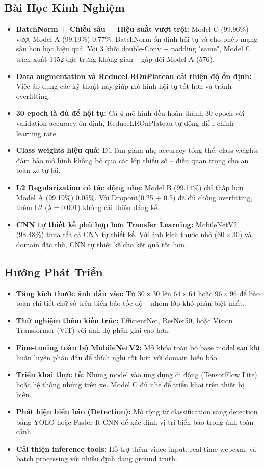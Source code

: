 \documentclass[12pt,a4paper]{article}
\begin{document}
\subsection{Bài Học Kinh Nghiệm}
\begin{itemize}
    \item \textbf{BatchNorm + Chiều sâu = Hiệu suất vượt trội:} Model C (99.96\%) vượt Model A (99.19\%) 0.77\%. BatchNorm ổn định hội tụ và cho phép mạng sâu hơn học hiệu quả. Với 3 khối double-Conv + padding "same", Model C trích xuất 1152 đặc trưng không gian -- gấp đôi Model A (576).
    \item \textbf{Data augmentation và ReduceLROnPlateau cải thiện độ ổn định:} Việc áp dụng các kỹ thuật này giúp mô hình hội tụ tốt hơn và tránh overfitting.
    \item \textbf{30 epoch là đủ để hội tụ:} Cả 4 mô hình đều hoàn thành 30 epoch với validation accuracy ổn định, ReduceLROnPlateau tự động điều chỉnh learning rate.
    \item \textbf{Class weights hiệu quả:} Dù làm giảm nhẹ accuracy tổng thể, class weights đảm bảo mô hình không bỏ qua các lớp thiểu số -- điều quan trọng cho an toàn xe tự lái.
    \item \textbf{L2 Regularization có tác động nhẹ:} Model B (99.14\%) chỉ thấp hơn Model A (99.19\%) 0.05\%. Với Dropout(0.25 + 0.5) đã đủ chống overfitting, thêm L2 ($\lambda=0.001$) không cải thiện đáng kể.
    \item \textbf{CNN tự thiết kế phù hợp hơn Transfer Learning:} MobileNetV2 (98.48\%) thua tất cả CNN tự thiết kế. Với ảnh kích thước nhỏ ($30\times30$) và domain đặc thù, CNN tự thiết kế cho kết quả tốt hơn.
\end{itemize}

\subsection{Hướng Phát Triển}
\begin{itemize}
    \item \textbf{Tăng kích thước ảnh đầu vào:} Từ $30\times30$ lên $64\times64$ hoặc $96\times96$ để bảo toàn chi tiết chữ số trên biển báo tốc độ -- nhóm lớp khó phân biệt nhất.
    \item \textbf{Thử nghiệm thêm kiến trúc:} EfficientNet, ResNet50, hoặc Vision Transformer (ViT) với ảnh độ phân giải cao hơn.
    \item \textbf{Fine-tuning toàn bộ MobileNetV2:} Mở khóa toàn bộ base model sau khi huấn luyện phần đầu để thích nghi tốt hơn với domain biển báo.
    \item \textbf{Triển khai thực tế:} Nhúng model vào ứng dụng di động (TensorFlow Lite) hoặc hệ thống nhúng trên xe. Model C đủ nhẹ để triển khai trên thiết bị biên.
    \item \textbf{Phát hiện biển báo (Detection):} Mở rộng từ classification sang detection bằng YOLO hoặc Faster R-CNN để xác định vị trí biển báo trong ảnh toàn cảnh.
    \item \textbf{Cải thiện inference tools:} Hỗ trợ thêm video input, real-time webcam, và batch processing với nhiều định dạng ground truth.
\end{itemize}
\end{document}
